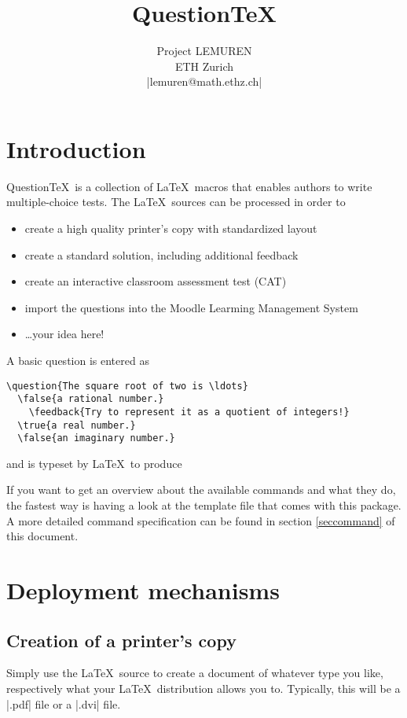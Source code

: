 \documentclass[a4paper,10pt]{ltxdoc}
\title{QuestionTeX}
\author{Project LEMUREN\\ETH Zurich\\|lemuren@math.ethz.ch|}
\begin{document}
\reversemarginpar

\maketitle
\tableofcontents
\newpage

\section{Introduction}
Question\TeX\ is a collection of \LaTeX\ macros that enables authors to
write multiple-choice tests.
The \LaTeX\  sources can be processed in order to
\begin{itemize}
  \item create a high quality printer's copy with standardized
  layout
  \item create a standard solution, including additional feedback
  \item create an interactive classroom assessment test (CAT)
  \item import the questions into the Moodle Learming Management System 
  \item \ldots your idea here!
\end{itemize}

A basic question is entered as

\begin{verbatim}
\question{The square root of two is \ldots}
  \false{a rational number.}
    \feedback{Try to represent it as a quotient of integers!}
  \true{a real number.}
  \false{an imaginary number.}
\end{verbatim}

and is typeset by \LaTeX\ to produce

If you want to get an overview about the available commands and what they
do, the fastest way is having a look at the template file that comes with
this package. A more detailed command specification can be found in section
\ref{seccommand} of this document.

\section{Deployment mechanisms}

\subsection{Creation of a printer's copy}
Simply use the \LaTeX\ source to create a document of whatever type you like,
respectively what your \LaTeX\ distribution allows you to. Typically, this will
be a |.pdf| file or a |.dvi| file.
\end{document}
